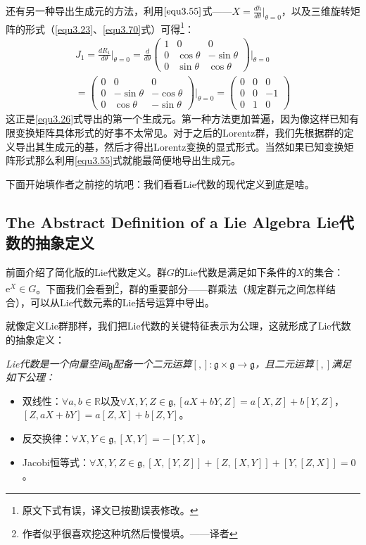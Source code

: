 还有另一种导出生成元的方法，利用$\eqref{equ3.55}$式——$X = \frac{dh}{d\theta}\big|_{\theta = 0}$，以及三维旋转矩阵的形式（\eqref{equ3.23}、\eqref{equ3.70}式）可得\footnote{原文下式有误，译文已按勘误表修改。}：
\begin{multline}
\label{equ3.74}
J_1 = \frac{dR_1}{d\theta} \bigg|_{\theta = 0} = \frac{d}{d\theta}
	\begin{pmatrix}
		1 & 0 & 0 \\
		0 & \cos \theta & -\sin \theta \\
		0 & \sin \theta & \cos \theta
	\end{pmatrix}
\Bigg|_{\theta = 0} \\
= 	\begin{pmatrix}
		0 & 0 & 0 \\
		0 & -\sin \theta & -\cos \theta \\
		0 & \cos \theta & -\sin \theta
	\end{pmatrix}
\Bigg|_{\theta = 0}
=	\begin{pmatrix}
		0 & 0 & 0 \\
		0 & 0 & -1 \\
		0 & 1 & 0
	\end{pmatrix}
\end{multline}
这正是\eqref{equ3.26}式导出的第一个生成元。第一种方法更加普遍，因为像这样已知有限变换矩阵具体形式的好事不太常见。对于之后的Lorentz群，我们先根据群的定义导出其生成元的基，然后才得出Lorentz变换的显式形式。当然如果已知变换矩阵形式那么利用\eqref{equ3.55}式就能最简便地导出生成元。

下面开始填作者之前挖的坑吧：我们看看Lie代数的现代定义到底是啥。

\subsection[Lie代数的抽象定义]{The Abstract Definition of a Lie Algebra \quad Lie代数的抽象定义}
\label{sec3.4.2}
前面介绍了简化版的Lie代数定义。群$G$的Lie代数是满足如下条件的$X$的集合：$\mathrm{e}^{X} \in G$。下面我们会看到\footnote{作者似乎很喜欢挖这种坑然后慢慢填。——译者}，群的重要部分——群乘法（规定群元之间怎样结合），可以从Lie代数元素的Lie括号运算中导出。

就像定义Lie群那样，我们把Lie代数的关键特征表示为公理，这就形成了Lie代数的抽象定义：

{\it
Lie代数是一个向量空间$\mathfrak{g}$配备一个二元运算$[,]: \mathfrak{g} \times \mathfrak{g} \rightarrow \mathfrak{g}$，且二元运算$[,]$满足如下公理：
\begin{itemize}
	\item 双线性：$\forall a, b \in \mathbb{R} \text{以及} \forall X, Y, Z \in \mathfrak{g}, [aX + bY, Z] = a[X, Z] + b[Y, Z]$，$[Z, aX + bY] = a[Z, X] + b[Z, Y]$。
	\item 反交换律：$\forall X, Y \in \mathfrak{g}, [X, Y] = -[Y, X]$。
	\item Jacobi恒等式：$\forall X, Y, Z \in \mathfrak{g}, [X, [Y, Z]] + [Z, [X, Y]] + [Y, [Z, X]] = 0$。
\end{itemize}
}


